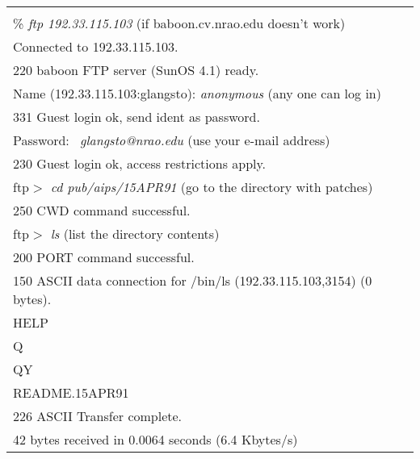 \tablestyle
{\tt
\begin{tabular}[h]{l}
\underline{\hskip 6.2in} \\
\% {\it ftp 192.33.115.103} \hfill (if baboon.cv.nrao.edu doesn't work)\\
Connected to 192.33.115.103. \\
220 baboon FTP server (SunOS 4.1) ready. \\
Name (192.33.115.103:glangsto): {\it anonymous} \hfill (any one can log in) \\
331 Guest login ok, send ident as password. \\
Password:~ {\it glangsto@nrao.edu}  \hfill (use your e-mail address) \\
230 Guest login ok, access restrictions apply. \\
ftp$>$ {\it cd pub/aips/15APR91} \hfill (go to the directory with patches) \\
250 CWD command successful. \\
ftp$>$ {\it ls}      \hfill (list the directory contents) \\
200 PORT command successful. \\
150 ASCII data connection for /bin/ls (192.33.115.103,3154) (0 bytes). \\
HELP \\
Q \\
QY \\
README.15APR91 \\
226 ASCII Transfer complete. \\
42 bytes received in 0.0064 seconds (6.4 Kbytes/s) \\
\end{tabular}

}
